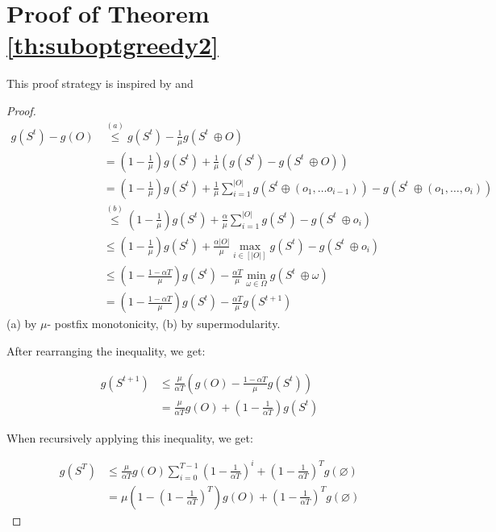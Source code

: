 \documentclass[12pt]{article}
\begin{document}
\section{Proof of Theorem \ref{th:suboptgreedy2}}

This proof strategy is inspired by \cite{streeter2008online} and \cite{liberty2017greedy}

\begin{proof}

\begin{align*}
    g(S^t) -g(O) &\overset{(a)}{\leq} g(S^t) - \frac{1}{\mu}g(S^t\ \oplus O) \\
    &= \left(1 - \frac{1}{\mu}\right)g(S^t) + \frac{1}{\mu}\left(g(S^t) - g(S^t\ \oplus O)\right) \\
    &=\left(1 - \frac{1}{\mu}\right)g(S^t) + \frac{1}{\mu}\sum_{i = 1}^{|O|} g(S^t \oplus \left(o_1, \dots o_{i - 1}\right)) -g(S^t\ \oplus \left(o_1, \dots, o_{i}\right))\\
    &\overset{(b)}{\leq} \left(1 - \frac{1}{\mu}\right)g(S^t) + \frac{\alpha}{\mu}\sum_{i = 1}^{|O|} g(S^t) -g(S^t\ \oplus  o_{i}) \\
    &\leq \left(1 - \frac{1}{\mu}\right)g(S^t) + \frac{\alpha|O|}{\mu}\max_{i \in [|O|]} g(S^t) -g(S^t\ \oplus  o_{i}) \\
    &\leq  \left(1 - \frac{1 - \alpha T}{\mu}\right)g(S^t) -  \frac{\alpha T}{\mu}\min_{\omega \in \Omega} g(S^t\ \oplus  \omega) \\
    &=  \left(1 - \frac{1 - \alpha T}{\mu}\right)g(S^t) -  \frac{\alpha T}{\mu}g(S^{t + 1})
\end{align*}
(a) by $\mu$- postfix monotonicity, (b) by supermodularity. 

After rearranging the inequality, we get:

\begin{align*}
    g(S^{t + 1}) &\leq \frac{\mu}{\alpha T}\left(g(O) -  \frac{1 - \alpha T}{\mu}g(S^t)\right) \\
    &= \frac{\mu}{\alpha T}g(O) + \left(1 - \frac{1}{\alpha T}\right)g(S^t)
\end{align*}

When recursively applying this inequality, we get:

\begin{align*}
     g(S^{T}) &\leq \frac{\mu}{\alpha T}g(O)\sum_{i = 0}^{T - 1}\left(1 - \frac{1}{\alpha T}\right)^i + \left(1 - \frac{1}{\alpha T}\right)^Tg(\varnothing) \\
     &= \mu \left(1 - \left(1 - \frac{1}{\alpha T}\right)^T\right)g(O) + \left(1 - \frac{1}{\alpha T}\right)^Tg(\varnothing)
\end{align*}
\end{proof}
\end{document}
